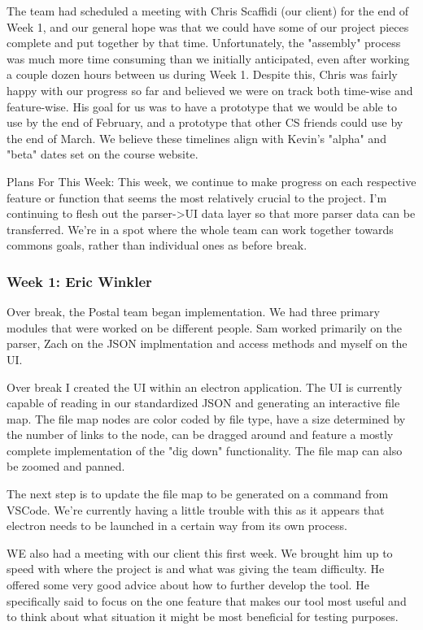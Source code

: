 The team had scheduled a meeting with Chris Scaffidi (our client) for the end of Week 1, and our general hope was that we could have some of our project pieces complete and put together by that time. Unfortunately, the "assembly" process was much more time consuming than we initially anticipated, even after working a couple dozen hours between us during Week 1. Despite this, Chris was fairly happy with our progress so far and believed we were on track both time-wise and feature-wise. His goal for us was to have a prototype that we would be able to use by the end of February, and a prototype that other CS friends could use by the end of March. We believe these timelines align with Kevin's "alpha" and "beta" dates set on the course website.

Plans For This Week:
This week, we continue to make progress on each respective feature or function that seems the most relatively crucial to the project. I'm continuing to flesh out the parser->UI data layer so that more parser data can be transferred. We're in a spot where the whole team can work together towards commons goals, rather than individual ones as before break.

\subsubsection{Week 1: Eric Winkler}

Over break, the Postal team began implementation. We had three primary modules that were worked on be different people. Sam worked primarily on the parser, Zach on the JSON implmentation and access methods and myself on the UI.

Over break I created the UI within an electron application. The UI is currently capable of reading in our standardized JSON and generating an interactive file map. The file map nodes are color coded by file type, have a size determined by the number of links to the node, can be dragged around and feature a mostly complete implementation of the "dig down" functionality. The file map can also be zoomed and panned.

The next step is to update the file map to be generated on a command from VSCode. We're currently having a little trouble with this as it appears that electron needs to be launched in a certain way from its own process.

WE also had a meeting with our client this first week. We brought him up to speed with where the project is and what was giving the team difficulty. He offered some very good advice about how to further develop the tool. He specifically said to focus on the one feature that makes our tool most useful and to think about what situation it might be most beneficial for testing purposes.

